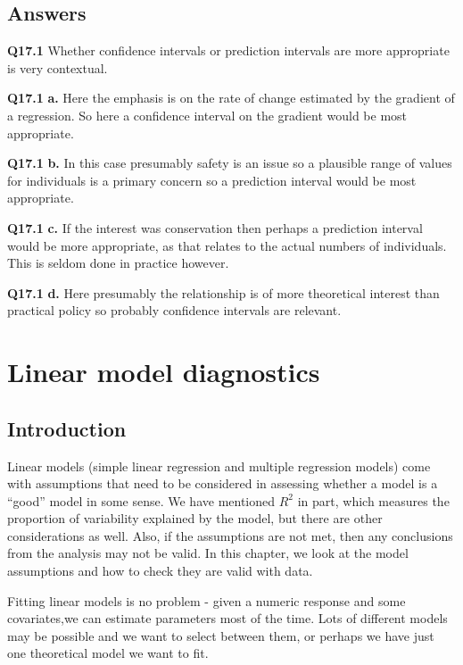 \documentclass[
  oneside]{krantz}
\begin{document}
\hypertarget{ANSpred}{%
\section{Answers}\label{ANSpred}}

\textbf{Q17.1} Whether confidence intervals or prediction intervals are more appropriate is very contextual.

\textbf{Q17.1} \textbf{a.} Here the emphasis is on the rate of change estimated by the gradient of a regression. So here a confidence interval on the gradient would be most appropriate.

\textbf{Q17.1} \textbf{b.} In this case presumably safety is an issue so a plausible range of values for individuals is a primary concern so a prediction interval would be most appropriate.

\textbf{Q17.1} \textbf{c.} If the interest was conservation then perhaps a prediction interval would be more appropriate, as that relates to the actual numbers of individuals. This is seldom done in practice however.

\textbf{Q17.1} \textbf{d.} Here presumably the relationship is of more theoretical interest than practical policy so probably confidence intervals are relevant.

\hypertarget{diagnostics}{%
\chapter{Linear model diagnostics}\label{diagnostics}}

\hypertarget{INTdiag}{%
\section{Introduction}\label{INTdiag}}

Linear models (simple linear regression and multiple regression models) come with assumptions that need to be considered in assessing whether a model is a ``good'' model in some sense. We have mentioned \(R^2\) in part, which measures the proportion of variability explained by the model, but there are other considerations as well. Also, if the assumptions are not met, then any conclusions from the analysis may not be valid. In this chapter, we look at the model assumptions and how to check they are valid with data.

Fitting linear models is no problem - given a numeric response and some covariates,we can estimate parameters most of the time. Lots of different models may be possible and we want to select between them, or perhaps we have just one theoretical model we want to fit.
\end{document}
